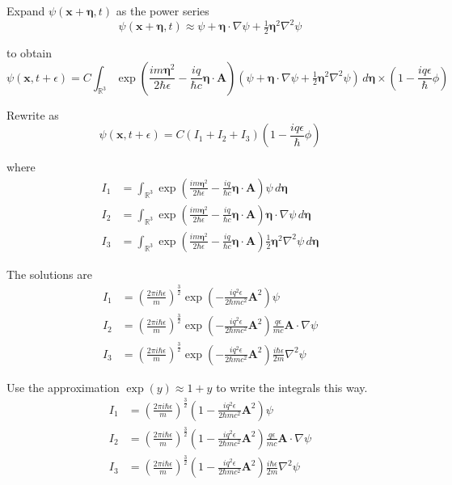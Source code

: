 Expand $\psi(\mathbf x+\boldsymbol\eta,t)$ as the power series
\begin{equation*}
\psi(\mathbf x+\boldsymbol\eta,t)\approx
\psi
+\boldsymbol\eta\cdot\nabla\psi
+\tfrac{1}{2}\boldsymbol\eta^2\nabla^2\psi
\end{equation*}

to obtain
\begin{equation*}
\psi(\mathbf x,t+\epsilon)
=C\int_{\mathbb R^3}
\exp\left(\frac{im\boldsymbol\eta^2}{2\hbar\epsilon}
-\frac{iq}{\hbar c}\boldsymbol\eta\cdot\mathbf A\right)
\left(
\psi
+\boldsymbol\eta\cdot\nabla\psi
+\tfrac{1}{2}\boldsymbol\eta^2\nabla^2\psi
\right)
\,d\boldsymbol\eta
\times\left(1-\frac{iq\epsilon}{\hbar}\phi\right)
\end{equation*}

Rewrite as
\begin{equation*}
\psi(\mathbf x,t+\epsilon)
=C(I_1+I_2+I_3)\left(1-\frac{iq\epsilon}{\hbar}\phi\right)
\tag{2}
\end{equation*}

where
\begin{align*}
I_1&=\int_{\mathbb R^3}
\exp\left(\frac{im\boldsymbol\eta^2}{2\hbar\epsilon}
-\frac{iq}{\hbar c}\boldsymbol\eta\cdot\mathbf A\right)
\psi\,d\boldsymbol\eta
\\
I_2&=\int_{\mathbb R^3}
\exp\left(\frac{im\boldsymbol\eta^2}{2\hbar\epsilon}
-\frac{iq}{\hbar c}\boldsymbol\eta\cdot\mathbf A\right)
\boldsymbol\eta\cdot\nabla\psi
\,d\boldsymbol\eta
\\
I_3&=\int_{\mathbb R^3}
\exp\left(\frac{im\boldsymbol\eta^2}{2\hbar\epsilon}
-\frac{iq}{\hbar c}\boldsymbol\eta\cdot\mathbf A\right)
\tfrac{1}{2}\boldsymbol\eta^2\nabla^2\psi
\,d\boldsymbol\eta
\end{align*}

The solutions are
\begin{align*}
I_1&=\left(\frac{2\pi i\hbar\epsilon}{m}\right)^\frac{3}{2}
\exp\left(-\frac{iq^2\epsilon}{2\hbar mc^2}\mathbf A^2\right)\psi
\\
I_2&=\left(\frac{2\pi i\hbar\epsilon}{m}\right)^\frac{3}{2}
\exp\left(-\frac{iq^2\epsilon}{2\hbar mc^2}\mathbf A^2\right)
\frac{q\epsilon}{mc}
\mathbf A\cdot\nabla\psi
\\
I_3&=\left(\frac{2\pi i\hbar\epsilon}{m}\right)^\frac{3}{2}
\exp\left(-\frac{iq^2\epsilon}{2\hbar mc^2}\mathbf A^2\right)
\frac{i\hbar\epsilon}{2m}\nabla^2\psi
\end{align*}

Use the approximation $\exp(y)\approx1+y$ to write the integrals this way.
\begin{align*}
I_1&=\left(\frac{2\pi i\hbar\epsilon}{m}\right)^\frac{3}{2}
\left(1-\frac{iq^2\epsilon}{2\hbar mc^2}\mathbf A^2\right)\psi
\\
I_2&=\left(\frac{2\pi i\hbar\epsilon}{m}\right)^\frac{3}{2}
\left(1-\frac{iq^2\epsilon}{2\hbar mc^2}\mathbf A^2\right)
\frac{q\epsilon}{mc}
\mathbf A\cdot\nabla\psi
\\
I_3&=\left(\frac{2\pi i\hbar\epsilon}{m}\right)^\frac{3}{2}
\left(1-\frac{iq^2\epsilon}{2\hbar mc^2}\mathbf A^2\right)
\frac{i\hbar\epsilon}{2m}\nabla^2\psi
\end{align*}

